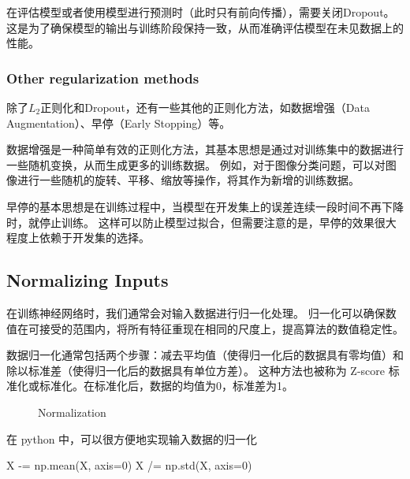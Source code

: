 在评估模型或者使用模型进行预测时（此时只有前向传播），需要关闭Dropout。这是为了确保模型的输出与训练阶段保持一致，从而准确评估模型在未见数据上的性能。

\subsubsection{Other regularization methods}

除了$L_2$正则化和Dropout，还有一些其他的正则化方法，如数据增强（Data Augmentation）、早停（Early Stopping）等。

数据增强是一种简单有效的正则化方法，其基本思想是通过对训练集中的数据进行一些随机变换，从而生成更多的训练数据。
例如，对于图像分类问题，可以对图像进行一些随机的旋转、平移、缩放等操作，将其作为新增的训练数据。

早停的基本思想是在训练过程中，当模型在开发集上的误差连续一段时间不再下降时，就停止训练。
这样可以防止模型过拟合，但需要注意的是，早停的效果很大程度上依赖于开发集的选择。

\subsection{Normalizing Inputs}

在训练神经网络时，我们通常会对输入数据进行归一化处理。
归一化可以确保数值在可接受的范围内，将所有特征重现在相同的尺度上，提高算法的数值稳定性。

数据归一化通常包括两个步骤：减去平均值（使得归一化后的数据具有零均值）和除以标准差（使得归一化后的数据具有单位方差）。
这种方法也被称为 Z-score 标准化或标准化。在标准化后，数据的均值为0，标准差为1。

\begin{figure}[h!bt]
    \centering
    \centering
    \caption{Normalization}
    \label{fig:normalization}
\end{figure}

在 python 中，可以很方便地实现输入数据的归一化
\begin{python}
X -= np.mean(X, axis=0)
X /= np.std(X, axis=0)
\end{python}

